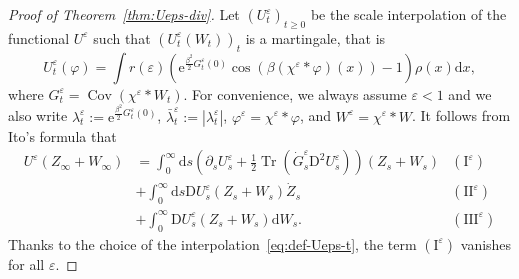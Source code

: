 \documentclass[11pt, a4paper]{scrartcl}
\numberwithin{equation}{section}
\theoremstyle{plain}
\theoremstyle{remark}
\newcommand{\Iota}{\mathrm{I}}
\newcommand{\assign}{:=}
\newcommand{\mathD}{\mathrm{D}}
\newcommand{\mathd}{\mathrm{d}}
\newcommand{\mathe}{\mathrm{e}}
\newcommand{\tmop}[1]{\ensuremath{\operatorname{#1}}}
\begin{document}
\begin{proof}[Proof of Theorem~\ref{thm:Ueps-div}]
	Let $(U_t^{\varepsilon})_{t \geqslant 0}$ be the scale interpolation of the functional
	$U^{\varepsilon}$ such that $(U_t^{\varepsilon} (W_t))_t$ is a martingale,
	that is
	\begin{equation}
		U_t^{\varepsilon} (\varphi) = \int r (\varepsilon) \left(
		\mathe^{\frac{\beta^2}{2} G_t^{\varepsilon} (0)} \cos (\beta
				(\chi^{\varepsilon} \ast \varphi) (x)) - 1 \right) \rho (x) \mathd x,
		\label{eq:def-Ueps-t}
	\end{equation}
	where $G_t^{\varepsilon} = \tmop{Cov} (\chi^{\varepsilon} \ast W_t)$. For
	convenience, we always assume $\varepsilon < 1$ and we also write
	$\lambda^{\varepsilon}_t \assign \mathe^{\frac{\beta^2}{2} G^{\varepsilon}_t
			(0)}$, $\bar{\lambda}^{\varepsilon}_t\assign |\lambda^{\varepsilon}_t|$, $\varphi^{\varepsilon} = \chi^{\varepsilon} \ast \varphi$, and
	$W^{\varepsilon} = \chi^{\varepsilon} \ast W$. It follows from Ito's formula
	that
	\[ \begin{aligned}
			U^{\varepsilon} (Z_{\infty} + W_{\infty}) & = \int_0^{\infty} \mathd
			s \left( \partial_s U^{\varepsilon}_s + \frac{1}{2} \tmop{Tr}
			(\dot{G}^{\varepsilon}_s \mathD^2 U^{\varepsilon}_s) \right) (Z_s +
			W_s)                                      & (\Iota^{\varepsilon})                                           \\
			                                          & + \int_0^{\infty} \mathd s \mathD U^{\varepsilon}_s (Z_s + W_s)
			\dot{Z}_s                                 & (\Iota \Iota^{\varepsilon})                                     \\
			                                          & + \int_0^{\infty} \mathD U^{\varepsilon}_s (Z_s + W_s)
			\mathd W_s .                              & (\Iota \Iota \Iota^{\varepsilon})
		\end{aligned} \]
	Thanks to the choice of the interpolation~\eqref{eq:def-Ueps-t}, the term
	$(\Iota^{\varepsilon})$ vanishes for all $\varepsilon$.


\end{proof}
\end{document}

